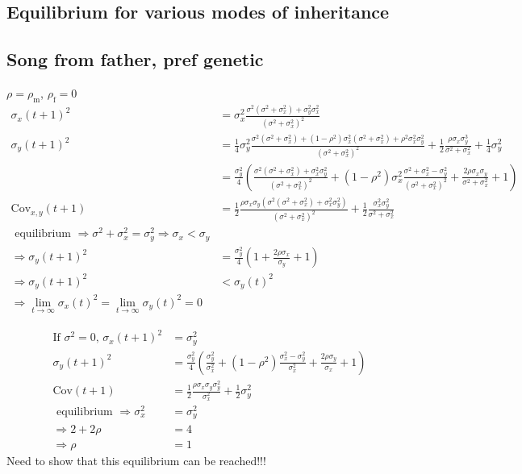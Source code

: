 \documentclass{article}
\newcommand{\x}[1]{\text{#1}}
\newcommand{\Cov}{\text{Cov}}
\begin{document}
\begin{landscape}
\section{Equilibrium for various modes of inheritance }
\subsection{Song from father, pref genetic }
$\rho = \rho_\x{m}$, $\rho_\x{f}=0$
\begin{align*}
\sigma_{x}(t+1)^2&=\sigma_{x}^2\frac{\sigma^2(\sigma^2+\sigma_{x}^2)+\sigma_y^2\sigma_x^2}{(\sigma^2+\sigma_x^2)^2}
\\ \sigma_y(t+1)^2&=\frac{1}{4}\sigma_y^2\frac{\sigma^2(\sigma^2+\sigma_x^2)+(1-\rho^2)\sigma_x^2(\sigma^2+\sigma_x^2)+\rho^2\sigma_x^2\sigma_y^2}{(\sigma^2+\sigma_x^2)^2}+\frac{1}{2}\frac{\rho\sigma_x\sigma_y^3}{\sigma^2+\sigma_x^2}+\frac{1}{4}\sigma_y^2 
\\ &=\frac{\sigma_y^2}{4}\left(\frac{\sigma^2(\sigma^2+\sigma_x^2)+\sigma_x^2\sigma_y^2}{(\sigma^2+\sigma_x^2)^2}+(1-\rho^2)\sigma_x^2\frac{\sigma^2+\sigma_x^2-\sigma_y^2}{(\sigma^2+\sigma_x^2)^2}+\frac{2\rho\sigma_x\sigma_y}{\sigma^2+\sigma_x^2}+1\right)
\\ \Cov_{x,y}(t+1)&=\frac{1}{2}\frac{\rho\sigma_x\sigma_y\left(\sigma^2(\sigma^2+\sigma_x^2)+\sigma_x^2\sigma_y^2\right)}{(\sigma^2+\sigma_x^2)^2}+\frac{1}{2}\frac{\sigma_x^2\sigma_y^2}{\sigma^2+\sigma_x^2}
\\\text{ equilibrium } \Rightarrow \sigma^2+\sigma_x^2=\sigma_y^2 \Rightarrow \sigma_x<\sigma_y
\\ \Rightarrow \sigma_y(t+1)^2&=\frac{\sigma_y^2}{4}\left(1+\frac{2\rho\sigma_x}{\sigma_y}+1\right)
\\ \Rightarrow \sigma_y(t+1)^2&<\sigma_y(t)^2
\\ \Rightarrow \lim_{t\to\infty}\sigma_x(t)^2=\lim_{t\to\infty}\sigma_y(t)^2=0
\end{align*}

\begin{align*}
\text{If $\sigma^2=0$, } \sigma_x(t+1)^2&=\sigma_y^2
\\ \sigma_y(t+1)^2&=\frac{\sigma_y^2}{4}\left(\frac{\sigma_y^2}{\sigma_x^2}+(1-\rho^2)\frac{\sigma_x^2-\sigma_y^2}{\sigma_x^2}+\frac{2\rho\sigma_y}{\sigma_x}+1\right)
\\\Cov(t+1)&=\frac{1}{2}\frac{\rho\sigma_x\sigma_y\sigma_y^2}{\sigma_x^2}+\frac{1}{2}\sigma_y^2
\\ \text{ equilibrium } \Rightarrow \sigma_x^2&=\sigma_y^2
\\ \Rightarrow 2+2\rho&=4
\\ \Rightarrow \rho&=1
\end{align*}
Need to show that this equilibrium can be reached!!!


\end{landscape}
\end{document}

